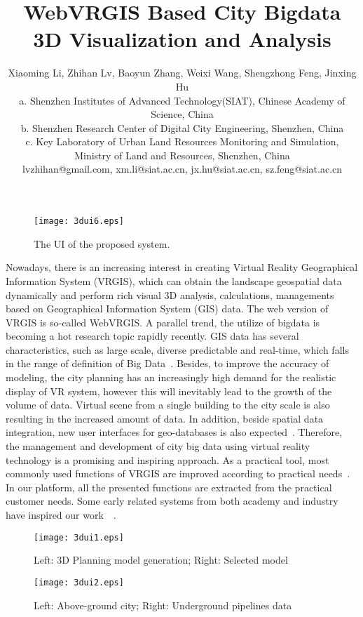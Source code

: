 \documentclass{vgtc}
\title{WebVRGIS Based City Bigdata 3D Visualization and Analysis}
\author{Xiaoming Li, Zhihan Lv, Baoyun Zhang, Weixi Wang, Shengzhong Feng, Jinxing Hu\\
a. Shenzhen Institutes of Advanced Technology(SIAT), Chinese Academy of Science, China\\
b. Shenzhen Research Center of Digital City Engineering, Shenzhen, China\\
c. Key Laboratory of Urban Land Resources Monitoring and Simulation, \\Ministry of Land and Resources, Shenzhen, China\\
lvzhihan@gmail.com, xm.li@siat.ac.cn, jx.hu@siat.ac.cn, sz.feng@siat.ac.cn}
\begin{document}
\maketitle


\begin{figure}
    \begin{center}
    \texttt{[image: 3dui6.eps]}
    \caption{The UI of the proposed system.}
    \label{fig:3dui6}
        \end{center}
\end{figure}





Nowadays, there is an increasing interest in creating Virtual Reality Geographical Information System (VRGIS), which can obtain the landscape
geospatial data dynamically and perform rich visual 3D analysis, calculations, managements based on Geographical Information System (GIS) data. The web version of VRGIS is so-called WebVRGIS. A parallel trend, the utilize of bigdata is becoming a hot research topic rapidly recently. GIS data
has several characteristics, such as large scale, diverse
predictable and real-time, which falls in the range of definition
of Big Data~\cite{bigdata}. Besides, to improve the accuracy of modeling, the city planning has an increasingly high demand for
the realistic display of VR system, however this will inevitably
lead to the growth of the volume of data. Virtual scene from a single building to the city scale is also resulting
in the increased amount of data. In addition, beside spatial data integration, new user interfaces for geo-databases is also expected~\cite{Breunig:2011:RGR:1998664.1998871}.
Therefore, the management and development of city big data using virtual reality technology is a promising and inspiring approach. 
As a practical tool, most commonly used functions of VRGIS are improved according to practical needs~\cite{Lin201374}. In our platform, all the presented functions are extracted from the practical customer needs. Some early related systems from both academy and industry have inspired our work~\cite{Zhang:2007:DDD:1279008.1279148}~\cite{Ma:2010:IVN:1869057.1869058}.

\begin{figure}
    \begin{center}
    \texttt{[image: 3dui1.eps]}
    \caption{Left: 3D Planning model generation; Right: Selected model}
    \label{fig:3dui1}
        \end{center}
\end{figure}
\begin{figure}
    \begin{center}
    \texttt{[image: 3dui2.eps]}
    \caption{Left: Above-ground city; Right: Underground pipelines data}
    \label{fig:3dui2}
        \end{center}
\end{figure}
\end{document}
